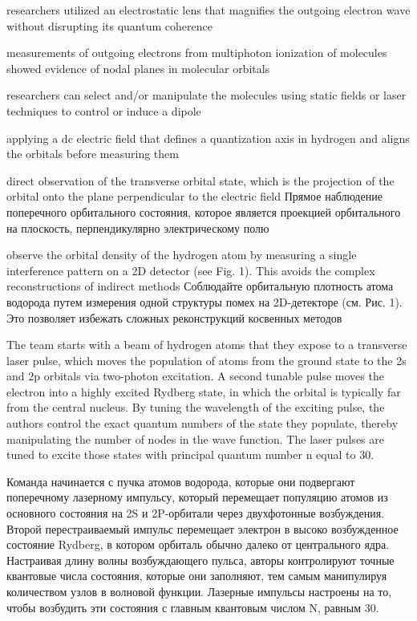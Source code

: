 researchers utilized an electrostatic lens that magnifies the outgoing electron wave without disrupting its quantum coherence

measurements of outgoing electrons from multiphoton ionization of molecules showed evidence of nodal planes in molecular orbitals

researchers can select and/or manipulate the molecules using static fields or laser techniques to control or induce a dipole

applying a dc electric field that defines a quantization axis in hydrogen and aligns the orbitals before measuring them

direct observation of the transverse orbital state, which is the projection of the orbital onto the plane perpendicular to the electric field
Прямое наблюдение поперечного орбитального состояния, которое является проекцией орбитального на плоскость, перпендикулярно электрическому полю

observe the orbital density of the hydrogen atom by measuring a single interference pattern on a 2D detector (see Fig. 1). This avoids the complex reconstructions of indirect methods
Соблюдайте орбитальную плотность атома водорода путем измерения одной структуры помех на 2D-детекторе (см. Рис. 1). Это позволяет избежать сложных реконструкций косвенных методов



The team starts with a beam of hydrogen atoms that they expose to a transverse laser pulse, which moves the population of atoms from the ground state to the 2s and 2p orbitals via two-photon excitation. A second tunable pulse moves the electron into a highly excited Rydberg state, in which the orbital is typically far from the central nucleus. By tuning the wavelength of the exciting pulse, the authors control the exact quantum numbers of the state they populate, thereby manipulating the number of nodes in the wave function. The laser pulses are tuned to excite those states with principal quantum number n equal to 30.

Команда начинается с пучка атомов водорода, которые они подвергают поперечному лазерному импульсу, который перемещает популяцию атомов из основного состояния на 2S и 2P-орбитали через двухфотонные возбуждения. Второй перестраиваемый импульс перемещает электрон в высоко возбужденное состояние Rydberg, в котором орбиталь обычно далеко от центрального ядра. Настраивая длину волны возбуждающего пульса, авторы контролируют точные квантовые числа состояния, которые они заполняют, тем самым манипулируя количеством узлов в волновой функции. Лазерные импульсы настроены на то, чтобы возбудить эти состояния с главным квантовым числом N, равным 30.



